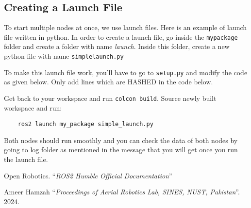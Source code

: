 \documentclass{article}
\begin{document}
\subsection{Creating a Launch File}
To start multiple nodes at once, we use launch files. Here is an example of launch file written in python.
In order to create a launch file, go inside the \texttt{my\textunderscore package} folder and create a folder with name \textit{launch}. Inside this folder, create a new python file with name \texttt{simple\textunderscore launch.py}

To make this launch file work, you'll have to go to \texttt{setup.py} and modify the code as given below. Only add lines which are HASHED in the code below.

Get back to your workspace and run \texttt{colcon build}. Source newly built workspace and run:
\begin{verbatim}
    ros2 launch my_package simple_launch.py
\end{verbatim}
Both nodes should run smoothly and you can check the data of both nodes by going to log folder as mentioned in the message that you will get once you run the launch file.  

\begin{thebibliography}{3}
    Open Robotics. ``\textit{ROS2 Humble Official Documentation}''

    Ameer Hamzah ``\textit{Proceedings of Aerial Robotics Lab, SINES, NUST, Pakistan}''. 2024.


\end{thebibliography}
\end{document}
